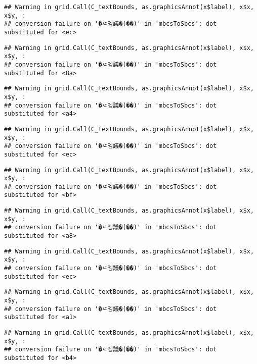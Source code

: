 \documentclass[
]{article}
\begin{document}
\begin{verbatim}
## Warning in grid.Call(C_textBounds, as.graphicsAnnot(x$label), x$x, x$y, :
## conversion failure on '�ㅼ엥議�(��)' in 'mbcsToSbcs': dot substituted for <ec>
\end{verbatim}

\begin{verbatim}
## Warning in grid.Call(C_textBounds, as.graphicsAnnot(x$label), x$x, x$y, :
## conversion failure on '�ㅼ엥議�(��)' in 'mbcsToSbcs': dot substituted for <8a>
\end{verbatim}

\begin{verbatim}
## Warning in grid.Call(C_textBounds, as.graphicsAnnot(x$label), x$x, x$y, :
## conversion failure on '�ㅼ엥議�(��)' in 'mbcsToSbcs': dot substituted for <a4>
\end{verbatim}

\begin{verbatim}
## Warning in grid.Call(C_textBounds, as.graphicsAnnot(x$label), x$x, x$y, :
## conversion failure on '�ㅼ엥議�(��)' in 'mbcsToSbcs': dot substituted for <ec>
\end{verbatim}

\begin{verbatim}
## Warning in grid.Call(C_textBounds, as.graphicsAnnot(x$label), x$x, x$y, :
## conversion failure on '�ㅼ엥議�(��)' in 'mbcsToSbcs': dot substituted for <bf>
\end{verbatim}

\begin{verbatim}
## Warning in grid.Call(C_textBounds, as.graphicsAnnot(x$label), x$x, x$y, :
## conversion failure on '�ㅼ엥議�(��)' in 'mbcsToSbcs': dot substituted for <a8>
\end{verbatim}

\begin{verbatim}
## Warning in grid.Call(C_textBounds, as.graphicsAnnot(x$label), x$x, x$y, :
## conversion failure on '�ㅼ엥議�(��)' in 'mbcsToSbcs': dot substituted for <ec>
\end{verbatim}

\begin{verbatim}
## Warning in grid.Call(C_textBounds, as.graphicsAnnot(x$label), x$x, x$y, :
## conversion failure on '�ㅼ엥議�(��)' in 'mbcsToSbcs': dot substituted for <a1>
\end{verbatim}

\begin{verbatim}
## Warning in grid.Call(C_textBounds, as.graphicsAnnot(x$label), x$x, x$y, :
## conversion failure on '�ㅼ엥議�(��)' in 'mbcsToSbcs': dot substituted for <b4>
\end{verbatim}
\end{document}
